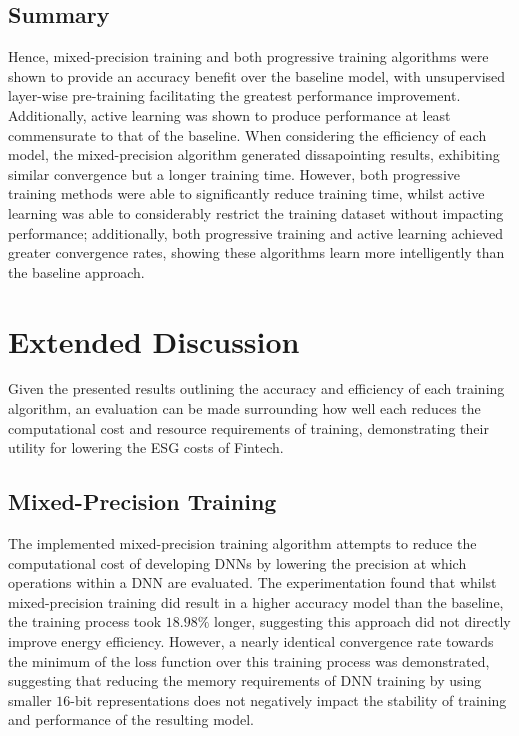 \documentclass[a4paper, 11pt]{report}
\begin{document}
    \subsection{Summary}

    Hence, mixed-precision training and both progressive training algorithms were shown to provide an accuracy benefit over the baseline model, with unsupervised layer-wise pre-training facilitating the greatest performance improvement. Additionally, active learning was shown to produce performance at least commensurate to that of the baseline. When considering the efficiency of each model, the mixed-precision algorithm generated dissapointing results, exhibiting similar convergence but a longer training time. However, both progressive training methods were able to significantly reduce training time, whilst active learning was able to considerably restrict the training dataset without impacting performance; additionally, both progressive training and active learning achieved greater convergence rates, showing these algorithms learn more intelligently than the baseline approach.


    \section{Extended Discussion}

    Given the presented results outlining the accuracy and efficiency of each training algorithm, an evaluation can be made surrounding how well each reduces the computational cost and resource requirements of training, demonstrating their utility for lowering the ESG costs of Fintech.


    \subsection{Mixed-Precision Training}

    The implemented mixed-precision training algorithm attempts to reduce the computational cost of developing DNNs by lowering the precision at which operations within a DNN are evaluated. The experimentation found that whilst mixed-precision training did result in a higher accuracy model than the baseline, the training process took $18.98\%$ longer, suggesting this approach did not directly improve energy efficiency. However, a nearly identical convergence rate towards the minimum of the loss function over this training process was demonstrated, suggesting that reducing the memory requirements of DNN training by using smaller $16$-bit representations does not negatively impact the stability of training and performance of the resulting model.
\end{document}
